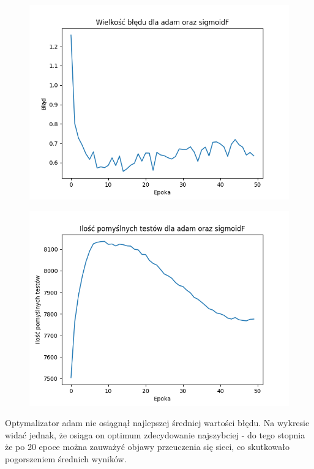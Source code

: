 \documentclass{article}
\begin{document}
\begin{figure}[!htb]
  \centering
  \includegraphics[width=\linewidth]{error_adam_sigmoidF.png}
\end{figure}

\begin{figure}[!htb]
  \centering
  \includegraphics[width=\linewidth]{test_adam_sigmoidF.png}
\end{figure}

Optymalizator adam nie osiągnął najlepszej średniej wartości błędu. Na wykresie widać jednak, że osiąga on optimum zdecydowanie najszybciej - do tego stopnia że po 20 epoce
można zauważyć objawy przeuczenia się sieci, co skutkowało pogorszeniem średnich wyników.
\end{document}
